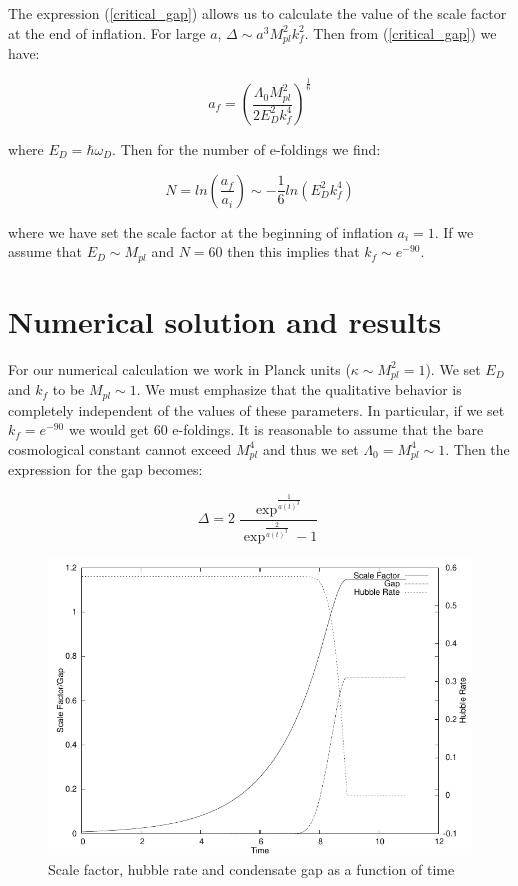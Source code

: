 \begin{doublespace}
The expression (\ref{critical_gap}) allows us to calculate the value
of the scale factor at the end of inflation. For large $a$, $\Delta
\sim a^3 M_{pl}^2 k_f^2 $. Then from (\ref{critical_gap}) we have:

\begin{equation}\label{final_a}
    a_f = \left ( \frac{\Lambda_0 M_{pl}^2}{2 E_D^2 k_f^4} \right)^\frac{1}{6}
\end{equation}

where $E_D = \hbar \omega_D$. Then for the number of e-foldings we
find:

\begin{equation}\label{efoldings}
    N = ln\left( \frac{a_f}{a_i} \right) \sim - \frac{1}{6} ln(E_D^2 k_f^4)
\end{equation}

where we have set the scale factor at the beginning of inflation
$a_i = 1$. If we assume that $E_D \sim M_{pl}$ and $N = 60$ then
this implies that $k_f \sim e^{-90}$.


\section{Numerical solution and results}

For our numerical calculation we work in Planck units ($\kappa \sim
M_{pl}^2 = 1$). We set $E_D$ and $k_f$ to be $M_{pl} \sim 1$. We
must emphasize that the qualitative behavior is completely
independent of the values of these parameters. In particular, if we
set $k_f = e^{-90}$ we would get 60 e-foldings. It is reasonable to
assume that the bare cosmological constant cannot exceed $M_{pl}^4$
and thus we set $\Lambda_0 = M_{pl}^4 \sim 1$. Then the expression
for the gap becomes:

\begin{equation}\label{gap}
    \Delta = 2\frac{\exp^{\frac{1}{a(t)^3}}}{\exp^{\frac{2}{a(t)^3}} - 1}
\end{equation}

\begin{figure}[htp]\label{fig:gap} 
\centering
\includegraphics[scale=0.6]{figures/cosmological_condensate/simplot.pdf}
\caption{Scale factor, hubble rate and condensate gap as a function of time}
\end{figure}


\end{doublespace}
